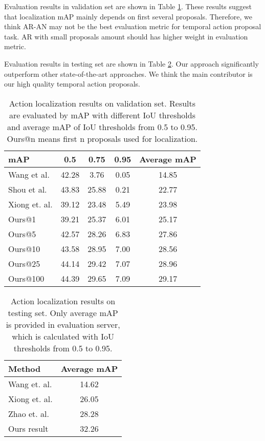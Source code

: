 \documentclass[10pt,twocolumn,letterpaper]{article}
\begin{document}
Evaluation results in validation set are shown in Table \ref{result_detection_val}. These results suggest that localization mAP  mainly depends on first several proposals. Therefore, we think AR-AN may not be the best evaluation metric for temporal action proposal task. AR with small proposals amount should has higher weight in evaluation metric.

Evaluation results in testing set are shown in Table \ref{result_detection_test}. Our approach significantly outperform other state-of-the-art approaches. We think the main contributor is our high quality temporal action proposals.

\begin{table}[tbp]

\centering
\caption{Action localization results on validation set. Results are evaluated by mAP with different IoU thresholds  and average mAP of IoU thresholds from 0.5 to 0.95. Ours@n means first n  proposals used for localization.}
\small
\begin{tabular}{p{2.2cm}<{\centering}|ccc|c<{\centering}}
\toprule
mAP  & 0.5  &  0.75  & 0.95  & Average mAP  \\
\hline Wang et al. \cite{wang2016uts}    & 42.28 & 3.76  & 0.05   & 14.85  \\
Shou et al. \cite{shou2017cdc}    & 43.83  & 25.88  & 0.21   & 22.77  \\
Xiong et. al. \cite{xiong2017pursuit}    & 39.12 & 23.48  & 5.49  & 23.98  \\
Ours@1   & 39.21  & 25.37  & 6.01   & 25.17  \\
Ours@5   & 42.57  & 28.26  & 6.83  & 27.86 \\
Ours@10 & 43.58   & 28.95  & 7.00  & 28.56 \\
Ours@25 & 44.14   & 29.42  & 7.07  & 28.96 \\
Ours@100 & 44.39   & 29.65  & 7.09  & 29.17 \\
\bottomrule
\end{tabular}
\label{result_detection_val}
\normalsize
\end{table}




\begin{table}[tbp]

\centering
\caption{Action localization results on testing set. Only average mAP is provided in evaluation server, which is calculated with IoU thresholds from 0.5 to 0.95.}
\small
\begin{tabular}{p{5cm}<{\centering}c<{\centering}}
\toprule
Method  & Average mAP    \\
\midrule Wang et. al. \cite{wang2016uts}    & 14.62 \\
Xiong et. al. \cite{xiong2017pursuit}    & 26.05 \\
Zhao et. al. \cite{zhao2017temporal}   & 28.28 \\
\midrule Ours result  & 32.26  \\
\bottomrule
\end{tabular}
\label{result_detection_test}
\normalsize
\end{table}
\end{document}
